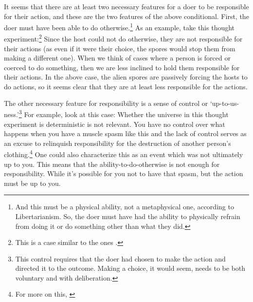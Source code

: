 It seems that there are at least two necessary features for a doer to be responsible for their action, and these are the two features of the above conditional. First, the doer must have been able to do otherwise.\footnote{And this must be a physical ability, not a metaphysical one, according to Libertarianism. So, the doer must have had the ability to physically refrain from doing it or do something other than what they did.}  As an example, take this thought experiment:\footnote{This is a case similar to the ones \cite[found in][ ]{Frankfurt1} \cite[and][ ]{Fischer1}.}
Since the host could not do otherwise, they are not responsible for their actions (as even if it were their choice, the spores would stop them from making a different one). When we think of cases where a person is forced or coerced to do something, then we are less inclined to hold them responsible for their actions. In the above case, the alien spores are passively forcing the hosts to do actions, so it seems clear that they are at least less responsible for the actions.

The other necessary feature for responsibility is a sense of control or ‘up-to-us-ness.’\footnote{This control requires that the doer had chosen to make the action and directed it to the outcome. Making a choice, it would seem, needs to be both voluntary and with deliberation.} For example, look at this case:
Whether the universe in this thought experiment is deterministic is not relevant. You have no control over what happens when you have a muscle spasm like this and the lack of control serves as an excuse to relinquish responsibility for the destruction of another person's clothing.\footnote{For more on this, \cite[see][ ]{Austin1}}  One could also characterize this as an event which was not ultimately up to you. This means that the ability-to-do-otherwise is not enough for responsibility. While it’s possible for you not to have that spasm, but the action must be up to you.
